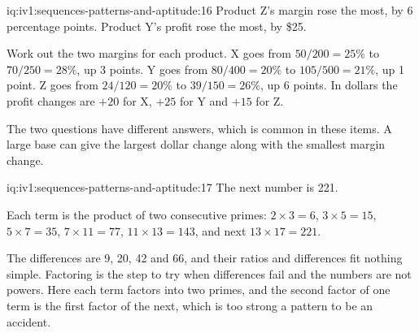 \begin{solution}{iq:iv1:sequences-patterns-and-aptitude:16}
Product Z's margin rose the most, by 6 percentage points. Product Y's profit rose the most, by \$25.

Work out the two margins for each product. X goes from $50/200 = 25\%$ to $70/250 = 28\%$, up 3 points. Y goes from $80/400 = 20\%$ to $105/500 = 21\%$, up 1 point. Z goes from $24/120 = 20\%$ to $39/150 = 26\%$, up 6 points. In dollars the profit changes are $+20$ for X, $+25$ for Y and $+15$ for Z.

The two questions have different answers, which is common in these items. A large base can give the largest dollar change along with the smallest margin change.

\end{solution}

\begin{solution}{iq:iv1:sequences-patterns-and-aptitude:17}
The next number is 221.

Each term is the product of two consecutive primes: $2 \times 3 = 6$, $3 \times 5 = 15$, $5 \times 7 = 35$, $7 \times 11 = 77$, $11 \times 13 = 143$, and next $13 \times 17 = 221$.

The differences are 9, 20, 42 and 66, and their ratios and differences fit nothing simple. Factoring is the step to try when differences fail and the numbers are not powers. Here each term factors into two primes, and the second factor of one term is the first factor of the next, which is too strong a pattern to be an accident.

\end{solution}

